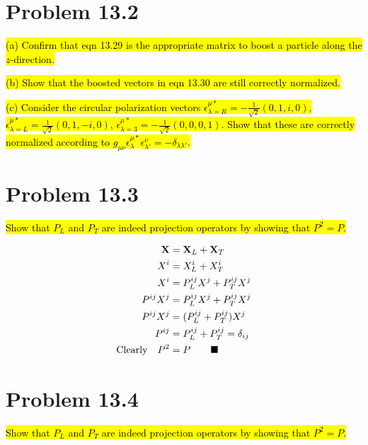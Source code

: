 \documentclass{article}
\begin{document}
\section*{Problem 13.2}
\begin{quoting}
  \hl{(a)  Confirm that eqn 13.29 is the appropriate matrix to boost a particle along the $z$-direction.}

  \hl{(b)  Show that the boosted vectors in eqn 13.30 are still correctly normalized.}

  \hl{(c)  Consider the circular polarization vectors $\epsilon^{\mu*}_{\lambda=R}=-\frac{1}{\sqrt{2}}(0,1,i,0)$, $\epsilon^{\mu*}_{\lambda=L}=\frac{1}{\sqrt{2}}(0,1,-i,0)$, $\epsilon^{\mu*}_{\lambda=3}=-\frac{1}{\sqrt{2}}(0,0,0,1)$. Show that these are correctly normalized according to $g_{\mu\nu}\epsilon^{\mu*}_\lambda \epsilon^\nu_{\lambda'}=-\delta_{\lambda\lambda'}$.}
\end{quoting}



\section*{Problem 13.3}
\begin{quoting}
  \hl{Show that $P_L$ and $P_T$ are indeed projection operators by showing that $P^2=P$.}
\end{quoting}
\begin{align*}
  \vb{X}           & =\vb{X}_L+\vb{X}_T             \\
  X^i              & =X^i_L+X^i_T                   \\
  X^i              & =P^{ij}_LX^j+P^{ij}_TX^j       \\
  P^{ij}X^j        & =P^{ij}_LX^j+P^{ij}_TX^j       \\
  P^{ij}X^j        & =(P^{ij}_L+P^{ij}_T)X^j        \\
  P^{ij}           & =P^{ij}_L+P^{ij}_T=\delta_{ij} \\
  \qq*{Clearly}P^2 & =P\qquad\blacksquare
\end{align*}



\section*{Problem 13.4}
\begin{quoting}
  \hl{Show that $P_L$ and $P_T$ are indeed projection operators by showing that $P^2=P$.}
\end{quoting}
\end{document}
